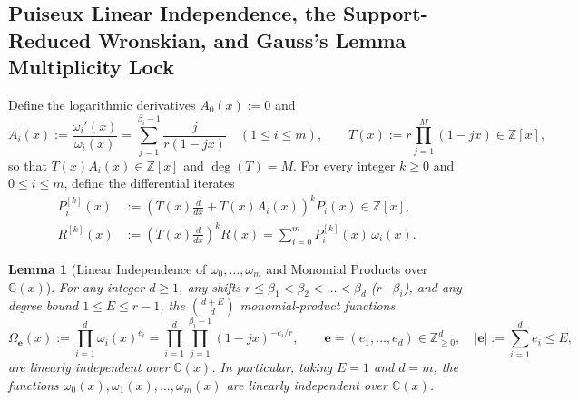 \documentclass[11pt,reqno]{amsart}
\newtheorem{lemma}[theorem]{Lemma}
\theoremstyle{remark}
\numberwithin{equation}{section}
\newcommand{\Z}{\mathbb{Z}}
\newcommand{\C}{\mathbb{C}}
\begin{document}
\subsection{Puiseux Linear Independence, the Support-Reduced Wronskian, and Gauss's Lemma Multiplicity Lock}
Define the logarithmic derivatives $A_0(x) := 0$ and
\begin{equation}\label{eq:7.6}
A_i(x) := \frac{\omega_i'(x)}{\omega_i(x)} = \sum_{j=1}^{\beta_i-1} \frac{j}{r(1 - jx)} \quad (1 \le i \le m), \qquad T(x) := r\prod_{j=1}^M (1 - jx) \in \Z[x],
\end{equation}
so that $T(x)A_i(x) \in \Z[x]$ and $\deg(T) = M$. For every integer $k \ge 0$ and $0 \le i \le m$, define the differential iterates
\begin{equation}\label{eq:7.7}
\begin{aligned}
P_i^{[k]}(x) &:= \left(T(x)\frac{d}{dx} + T(x)A_i(x)\right)^k P_i(x) \in \Z[x], \\
R^{[k]}(x) &:= \left(T(x)\frac{d}{dx}\right)^k R(x) = \sum_{i=0}^m P_i^{[k]}(x)\,\omega_i(x).
\end{aligned}
\end{equation}

\begin{lemma}[{Linear Independence of $\omega_0, \dots, \omega_m$ and Monomial Products over $\C(x)$}]\label{lem:7.2}
For any integer $d \ge 1$, any shifts $r \le \beta_1 < \beta_2 < \dots < \beta_d$ ($r \mid \beta_i$), and any degree bound $1 \le E \le r - 1$, the $\binom{d+E}{d}$ monomial-product functions
\begin{equation}\label{eq:7.8}
\Omega_{\mathbf{e}}(x) := \prod_{i=1}^d \omega_i(x)^{e_i} = \prod_{i=1}^d \prod_{j=1}^{\beta_i-1} (1 - jx)^{-e_i/r}, \qquad \mathbf{e} = (e_1, \dots, e_d) \in \Z_{\ge 0}^d, \quad |\mathbf{e}| := \sum_{i=1}^d e_i \le E,
\end{equation}
are linearly independent over $\C(x)$. In particular, taking $E = 1$ and $d = m$, the functions $\omega_0(x), \omega_1(x), \dots, \omega_m(x)$ are linearly independent over $\C(x)$.
\end{lemma}
\end{document}
